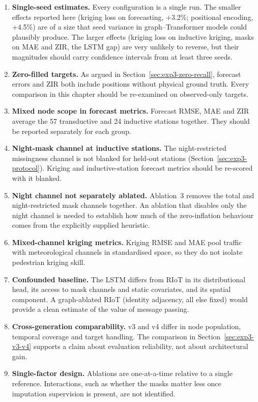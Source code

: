\begin{enumerate}
    \item \textbf{Single-seed estimates.} Every configuration is a
    single run. The smaller effects reported here (kriging loss on
    forecasting, +3.2\%; positional encoding, +4.5\%) are of a size that
    seed variance in graph--Transformer models could plausibly produce.
    The larger effects (kriging loss on inductive kriging, masks on MAE
    and ZIR, the LSTM gap) are very unlikely to reverse, but
    their magnitudes should carry confidence intervals from at least
    three seeds.
    \item \textbf{Zero-filled targets.} As argued in
    Section~\ref{sec:exp3-zero-recall}, forecast errors and ZIR
    both include positions without physical ground truth. Every
    comparison in this chapter should be re-examined on observed-only
    targets.
    \item \textbf{Mixed node scope in forecast metrics.} Forecast RMSE,
    MAE and ZIR average the 57 transductive and 24 inductive stations
    together. They should be reported separately for each group.
    \item \textbf{Night-mask channel at inductive stations.} The
    night-restricted missingness channel is not blanked for held-out
    stations (Section~\ref{sec:exp3-protocol}). Kriging and
    inductive-station forecast metrics should be re-scored with it
    blanked.
    \item \textbf{Night channel not separately ablated.} Ablation~3
    removes the total and night-restricted mask channels together. An
    ablation that disables only the night channel is needed to establish
    how much of the zero-inflation behaviour comes from the explicitly
    supplied heuristic.
    \item \textbf{Mixed-channel kriging metrics.} Kriging RMSE and MAE
    pool traffic with meteorological channels in standardised space, so
    they do not isolate pedestrian kriging skill.
    \item \textbf{Confounded baseline.} The LSTM differs from RIoT in its
    distributional head, its access to mask channels and static
    covariates, and its spatial component. A
    graph-ablated RIoT (identity adjacency, all else fixed) would
    provide a clean estimate of the value of message passing.
    \item \textbf{Cross-generation comparability.} v3 and v4 differ in
    node population, temporal coverage and target handling. The
    comparison in Section~\ref{sec:exp3-v3-v4} supports a claim about
    evaluation reliability, not about architectural gain.
    \item \textbf{Single-factor design.} Ablations are one-at-a-time
    relative to a single reference. Interactions, such as whether the
    masks matter less once imputation supervision is present, are not
    identified.
\end{enumerate}

